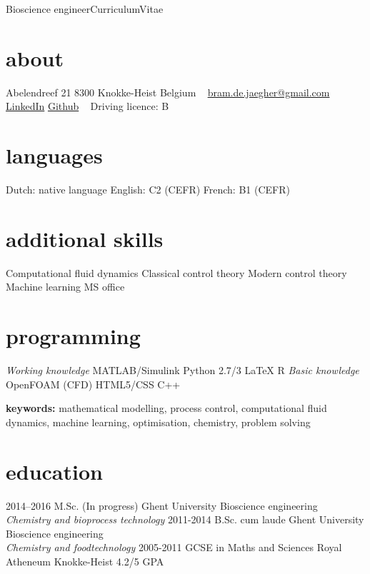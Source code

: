 \documentclass[]{friggeri-cv}
\begin{document}
       {Bioscience engineer}{Curriculum}{Vitae}
\begin{aside}
  \section{about}
    Abelendreef 21
    8300 Knokke-Heist
    Belgium
    ~
    \href{mailto:bram.de.jaegher@gmail.com}{bram.de.jaegher@gmail.com}
    \href{http://be.linkedin.com/in/BramDeJaegher}{LinkedIn}
    \href{https://github.com/Beramos}{Github}
    ~
    Driving licence: B \vspace{-0.8mm}
  \section{languages}
    Dutch: native language
    English: C2 (CEFR)
    French:  B1  (CEFR) \vspace{3.3mm}
  \section{additional skills}
  Computational fluid dynamics
  Classical control theory 
  Modern control theory 
  Machine learning
  MS office \vspace{8mm}
  \section{programming} 
  \textit{Working knowledge}
  MATLAB/Simulink
  Python 2.7/3
  LaTeX
  R \vspace{0.1cm}
  \textit{Basic knowledge}
  OpenFOAM (CFD)
  HTML5/CSS
  C++
\end{aside}
\vspace{3mm}
\textbf{keywords:} mathematical modelling, process control, computational fluid dynamics, machine learning, optimisation, chemistry, problem solving
\vspace{3mm}

\section{education}
\begin{entrylist}
    \entry
    {2014–2016}
    {M.Sc. (In progress)}
    {Ghent University}
    {Bioscience engineering\\
    \emph{Chemistry and bioprocess technology}}
  \entry
    {2011-2014}
    {B.Sc. cum laude}
    {Ghent University}
    {Bioscience engineering\\
    \emph{Chemistry and foodtechnology}}
  \entry
    {2005-2011}
    {GCSE in Maths and Sciences}
    {Royal Atheneum Knokke-Heist}
    {4.2/5 GPA}
\end{entrylist}
\end{document}
